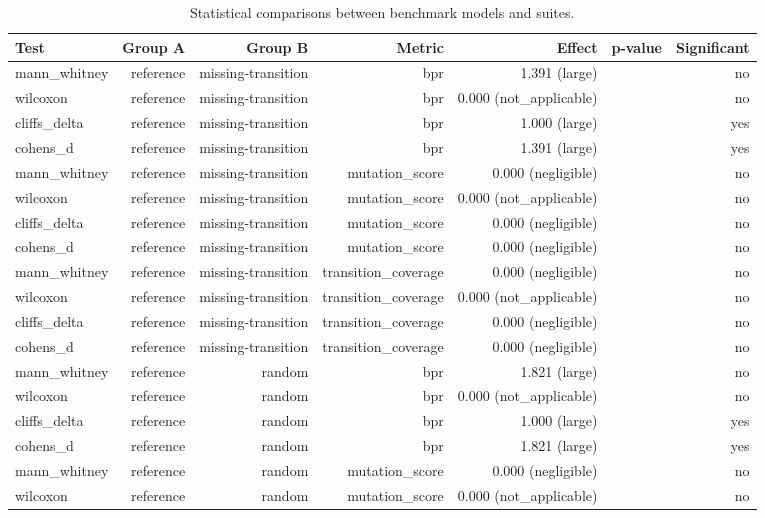 \begin{table}[t]
\centering
\caption{Statistical comparisons between benchmark models and suites.}
\label{tab:statistical_tests}
\begin{tabular}{lrrrrrr}
\toprule
Test & Group A & Group B & Metric & Effect & p-value & Significant \\
\midrule
mann\_whitney & reference & missing-transition & bpr & 1.391 (large) &  & no \\
wilcoxon & reference & missing-transition & bpr & 0.000 (not\_applicable) &  & no \\
cliffs\_delta & reference & missing-transition & bpr & 1.000 (large) &  & yes \\
cohens\_d & reference & missing-transition & bpr & 1.391 (large) &  & yes \\
mann\_whitney & reference & missing-transition & mutation\_score & 0.000 (negligible) &  & no \\
wilcoxon & reference & missing-transition & mutation\_score & 0.000 (not\_applicable) &  & no \\
cliffs\_delta & reference & missing-transition & mutation\_score & 0.000 (negligible) &  & no \\
cohens\_d & reference & missing-transition & mutation\_score & 0.000 (negligible) &  & no \\
mann\_whitney & reference & missing-transition & transition\_coverage & 0.000 (negligible) &  & no \\
wilcoxon & reference & missing-transition & transition\_coverage & 0.000 (not\_applicable) &  & no \\
cliffs\_delta & reference & missing-transition & transition\_coverage & 0.000 (negligible) &  & no \\
cohens\_d & reference & missing-transition & transition\_coverage & 0.000 (negligible) &  & no \\
mann\_whitney & reference & random & bpr & 1.821 (large) &  & no \\
wilcoxon & reference & random & bpr & 0.000 (not\_applicable) &  & no \\
cliffs\_delta & reference & random & bpr & 1.000 (large) &  & yes \\
cohens\_d & reference & random & bpr & 1.821 (large) &  & yes \\
mann\_whitney & reference & random & mutation\_score & 0.000 (negligible) &  & no \\
wilcoxon & reference & random & mutation\_score & 0.000 (not\_applicable) &  & no \\

\end{tabular}
\end{table}
